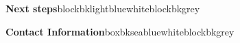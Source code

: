 \documentclass{beamer}
\begin{document}
\begin{frame}[t]
\begin{columns}[T]
\begin{column}{.46\textwidth}
				
				\begin{customblock}{\textbf{Next steps}}{blockbklightblue}{white}{blockbkgrey}
					
				\end{customblock}
			
%					
%			
				\begin{customblock}{\textbf{Contact Information}}{boxbkseablue}{white}{blockbkgrey}
				
				\end{customblock}
			
			\end{column}
			
		\end{columns}

	\end{frame}
\end{document}
